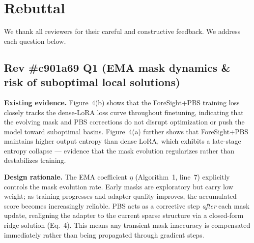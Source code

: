 \documentclass{article}
\begin{document}
		
		
		

\section*{Rebuttal}

We thank all reviewers for their careful and constructive feedback. We address each question below.

\subsection*{Rev \#c901a69 Q1 (EMA mask dynamics \& risk of suboptimal local solutions)}

\textbf{Existing evidence.} Figure~4(b) shows that the ForeSight+PBS training loss closely tracks the dense-LoRA loss curve throughout finetuning, indicating that the evolving mask and PBS corrections do not disrupt optimization or push the model toward suboptimal basins. Figure~4(a) further shows that ForeSight+PBS maintains higher output entropy than dense LoRA, which exhibits a late-stage entropy collapse --- evidence that the mask evolution regularizes rather than destabilizes training.

\textbf{Design rationale.} The EMA coefficient $\eta$ (Algorithm~1, line~7) explicitly controls the mask evolution rate. Early masks are exploratory but carry low weight; as training progresses and adapter quality improves, the accumulated score becomes increasingly reliable. PBS acts as a corrective step \emph{after} each mask update, realigning the adapter to the current sparse structure via a closed-form ridge solution (Eq.~4). This means any transient mask inaccuracy is compensated immediately rather than being propagated through gradient steps.
\end{document}
